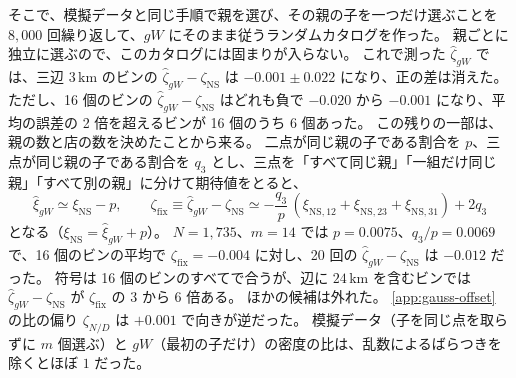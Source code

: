 \documentclass[a4paper,11pt]{ltjsarticle}
\begin{document}
そこで、模擬データと同じ手順で親を選び、その親の子を一つだけ選ぶことを $8{,}000$ 回繰り返して、$gW$ にそのまま従うランダムカタログを作った。
親ごとに独立に選ぶので、このカタログには固まりが入らない。
これで測った $\hat\zeta_{gW}$ では、三辺 $3\,\mathrm{km}$ のビンの $\hat\zeta_{gW} - \zeta_{\mathrm{NS}}$ は $-0.001 \pm 0.022$ になり、正の差は消えた。
ただし、16 個のビンの $\hat\zeta_{gW} - \zeta_{\mathrm{NS}}$ はどれも負で $-0.020$ から $-0.001$ になり、平均の誤差の 2 倍を超えるビンが 16 個のうち 6 個あった。
この残りの一部は、親の数と店の数を決めたことから来る。
二点が同じ親の子である割合を $p$、三点が同じ親の子である割合を $q_3$ とし、三点を「すべて同じ親」「一組だけ同じ親」「すべて別の親」に分けて期待値をとると、
\begin{equation}
  \hat\xi_{gW} \simeq \xi_{\mathrm{NS}} - p, \qquad
  \zeta_{\mathrm{fix}} \equiv \hat\zeta_{gW} - \zeta_{\mathrm{NS}} \simeq -\frac{q_3}{p}\,(\xi_{\mathrm{NS},12} + \xi_{\mathrm{NS},23} + \xi_{\mathrm{NS},31}) + 2 q_3
  \label{eq:zeta-fixed}
\end{equation}
となる（$\xi_{\mathrm{NS}} = \hat\xi_{gW} + p$）。
$N = 1{,}735$、$m = 14$ では $p = 0.0075$、$q_3/p = 0.0069$ で、16 個のビンの平均で $\zeta_{\mathrm{fix}} = -0.004$ に対し、20 回の $\hat\zeta_{gW} - \zeta_{\mathrm{NS}}$ は $-0.012$ だった。
符号は 16 個のビンのすべてで合うが、辺に $24\,\mathrm{km}$ を含むビンでは $\hat\zeta_{gW} - \zeta_{\mathrm{NS}}$ が $\zeta_{\mathrm{fix}}$ の 3 から 6 倍ある。
ほかの候補は外れた。
\ref{app:gauss-offset} の比の偏り $\zeta_{N/D}$ は $+0.001$ で向きが逆だった。
模擬データ（子を同じ点を取らずに $m$ 個選ぶ）と $gW$（最初の子だけ）の密度の比は、乱数によるばらつきを除くとほぼ $1$ だった。
\end{document}
